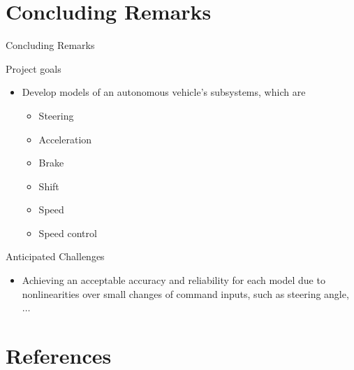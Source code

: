 \documentclass{beamer}
\begin{document}
\section{Concluding Remarks}
\begin{frame}{Concluding Remarks}
  \begin{block}{Project goals}
      \begin{itemize}
        \item Develop models of an autonomous vehicle's subsystems, which are 
        \begin{itemize}
          \item Steering %
          \item Acceleration %
          \item Brake %
          \item Shift %
          \item Speed %
          \item Speed control %
        \end{itemize}
      \end{itemize}
  \end{block}
  \begin{block}{Anticipated Challenges}
    \begin{itemize}
      \item Achieving an acceptable accuracy and reliability for each model due to nonlinearities over small changes of command inputs, such as steering angle, $\ldots$
    \end{itemize}
  \end{block}
\end{frame}


\section{References}
\end{document}
